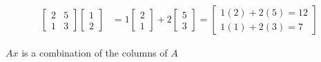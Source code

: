 \documentclass[12pt]{article}
\begin{document}
\begin{align*}
    \begin{bmatrix}
      2 & 5\\
      1 & 3
    \end{bmatrix}
    \begin{bmatrix}
    1\\
    2
    \end{bmatrix}
    &= 
    1 \begin{bmatrix}
    2\\
    1
    \end{bmatrix}
    +
    2 \begin{bmatrix}
    5\\
    3
    \end{bmatrix}
    = \begin{bmatrix}
    1(2) + 2(5) = 12\\
    1(1) + 2(3) = 7
    \end{bmatrix}
\end{align*}

$Ax$ is a combination of the columns of $ A $
\end{document}
